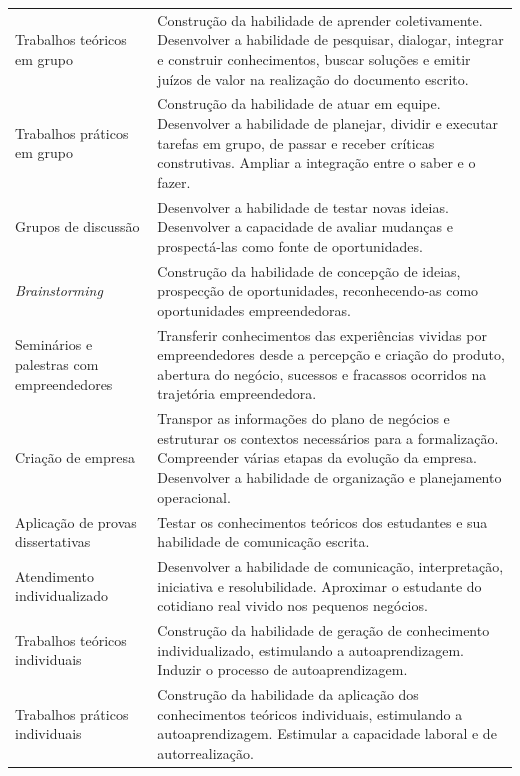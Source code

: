\begin{center}
\begin{longtable}{p{3.5cm}p{11.0cm}}
Trabalhos teóricos em grupo & Construção da habilidade de aprender coletivamente. Desenvolver a
habilidade de pesquisar, dialogar, integrar e construir conhecimentos,
buscar soluções e emitir juízos de valor na realização do documento escrito. \\ 

Trabalhos práticos em grupo & Construção da habilidade de atuar em equipe. Desenvolver a habilidade de
planejar, dividir e executar tarefas em grupo, de passar e receber críticas construtivas. Ampliar a integração entre o saber e o fazer.  \\ 

Grupos de discussão & Desenvolver a habilidade de testar novas ideias. Desenvolver a capacidade de avaliar mudanças e prospectá-las como fonte de oportunidades. \\ 
 
\textit{Brainstorming}  & Construção da habilidade de concepção de ideias, prospecção de
oportunidades, reconhecendo-as como oportunidades empreendedoras. \\ 


Seminários e palestras com empreendedores & Transferir conhecimentos das experiências vividas por empreendedores
desde a percepção e criação do produto, abertura do negócio, sucessos e
fracassos ocorridos na trajetória empreendedora. \\ 

Criação de empresa & Transpor as informações do plano de negócios e estruturar os contextos necessários para a formalização. Compreender várias etapas da evolução da empresa. Desenvolver a habilidade de organização e planejamento operacional. \\ 

Aplicação de provas dissertativas & Testar os conhecimentos teóricos dos estudantes e sua habilidade de
comunicação escrita. \\ 

Atendimento individualizado & Desenvolver a habilidade de comunicação, interpretação, iniciativa e
resolubilidade. Aproximar o estudante do cotidiano real vivido nos pequenos negócios. \\ 

Trabalhos teóricos individuais & Construção da habilidade de geração de conhecimento individualizado,
estimulando a autoaprendizagem. Induzir o processo de autoaprendizagem. \\ 

Trabalhos práticos individuais & Construção da habilidade da aplicação dos conhecimentos teóricos
individuais, estimulando a autoaprendizagem. Estimular a capacidade
laboral e de autorrealização. \\ 


\end{longtable}
\end{center}
